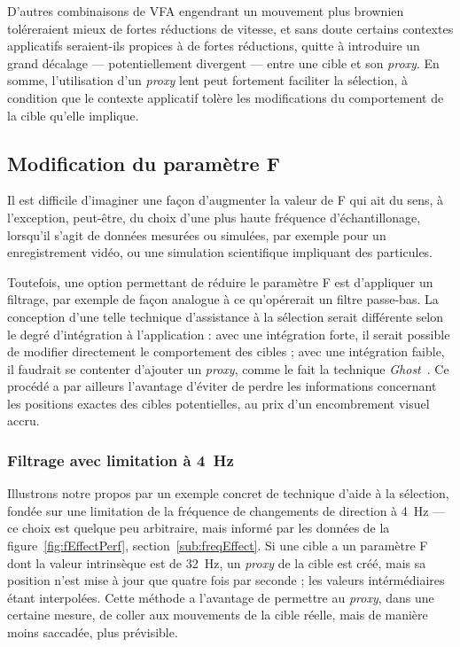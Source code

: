 	D'autres combinaisons de VFA engendrant un mouvement plus \og brownien \fg{} toléreraient mieux de fortes réductions de vitesse, et sans doute certains contextes applicatifs seraient-ils propices à de fortes réductions, quitte à introduire un grand décalage --- potentiellement divergent --- entre une cible et son \emph{proxy}. En somme, l'utilisation d'un \emph{proxy} lent peut fortement faciliter la sélection, à condition que le contexte applicatif tolère les modifications du comportement de la cible qu'elle implique.
	
	\subsection{Modification du paramètre F}
	Il est difficile d'imaginer une façon d'augmenter la valeur de F qui ait du sens, à l'exception, peut-être, du choix d'une plus haute fréquence d'échantillonage, lorsqu'il s'agit de données mesurées ou simulées, par exemple pour un enregistrement vidéo, ou une simulation scientifique impliquant des particules.
	
	Toutefois, une option permettant de réduire le paramètre F est d'appliquer un filtrage, par exemple de façon analogue à ce qu'opérerait un filtre passe-bas. La conception d'une telle technique d'assistance à la sélection serait différente selon le degré d'intégration à l'application : avec une intégration forte, il serait possible de modifier directement le comportement des cibles ; avec une intégration faible, il faudrait se contenter d'ajouter un \emph{proxy}, comme le fait la technique \emph{Ghost}~\cite{hasan2011comet}. Ce procédé a par ailleurs l'avantage d'éviter de perdre les informations concernant les positions exactes des cibles potentielles, au prix d'un encombrement visuel accru.
	
	\subsubsection{Filtrage avec limitation à 4~Hz}
	Illustrons notre propos par un exemple concret de technique d'aide à la sélection, fondée sur une limitation de la fréquence de changements de direction à 4~Hz --- ce choix est quelque peu arbitraire, mais informé par les données de la figure~\ref{fig:fEffectPerf}, section~\ref{sub:freqEffect}. Si une cible a un paramètre F dont la valeur intrinsèque est de 32~Hz, un \emph{proxy} de la cible est créé, mais sa position n'est mise à jour que quatre fois par seconde ; les valeurs intérmédiaires étant interpolées. Cette méthode a l'avantage de permettre au \emph{proxy}, dans une certaine mesure, de \og coller \fg{} aux mouvements de la cible réelle, mais de manière moins saccadée, plus prévisible.
	
